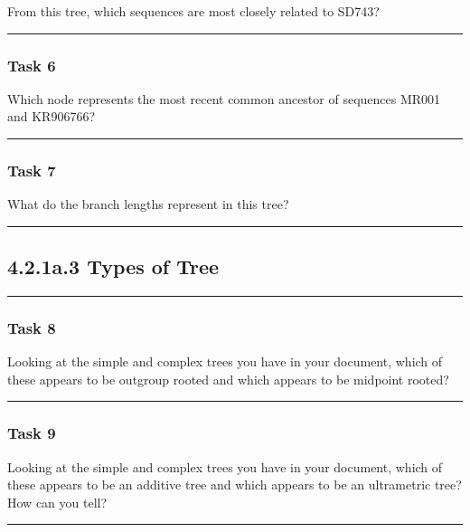 \documentclass[
]{article}
\begin{document}
From this tree, which sequences are most closely related to SD743?

\begin{center}\rule{0.5\linewidth}{0.5pt}\end{center}

\hypertarget{task-6}{%
\subsubsection{Task 6}\label{task-6}}

Which node represents the most recent common ancestor of sequences MR001
and KR906766?

\begin{center}\rule{0.5\linewidth}{0.5pt}\end{center}

\hypertarget{task-7}{%
\subsubsection{Task 7}\label{task-7}}

What do the branch lengths represent in this tree?

\begin{center}\rule{0.5\linewidth}{0.5pt}\end{center}

\hypertarget{a.3-types-of-tree}{%
\subsection{4.2.1a.3 Types of Tree}\label{a.3-types-of-tree}}

\begin{center}\rule{0.5\linewidth}{0.5pt}\end{center}

\hypertarget{task-8}{%
\subsubsection{Task 8}\label{task-8}}

Looking at the simple and complex trees you have in your document, which
of these appears to be outgroup rooted and which appears to be midpoint
rooted?

\begin{center}\rule{0.5\linewidth}{0.5pt}\end{center}

\hypertarget{task-9}{%
\subsubsection{Task 9}\label{task-9}}

Looking at the simple and complex trees you have in your document, which
of these appears to be an additive tree and which appears to be an
ultrametric tree? How can you tell?

\begin{center}\rule{0.5\linewidth}{0.5pt}\end{center}
\end{document}
